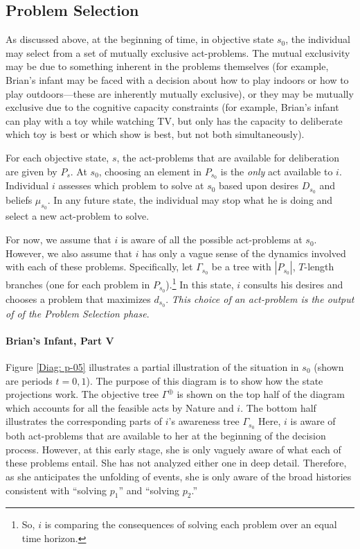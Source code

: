 \documentclass[
11pt,
titlepage,
reqno,
]{article}%
\theoremstyle{definition}
\begin{document}
\subsection{Problem Selection}

As discussed above, at the beginning of time, in objective state $s_0$, the individual may select from a set of mutually exclusive act-problems. 
The mutual exclusivity may be due to something inherent in the problems themselves (for example, Brian's infant may be faced with a decision about how to play indoors or how to play outdoors---these are inherently mutually exclusive), or they may be mutually exclusive due to the cognitive capacity constraints (for example, Brian's infant can play with a toy while watching TV, but only has the capacity to deliberate which toy is best or which show is best, but not both simultaneously).

For each objective state, $s$, the act-problems that are available for deliberation are given by $P_s$.
At $s_0$, choosing an element in $P_{s_0}$ is the \textit{only} act available to $i$.
Individual $i$ assesses which problem to solve at $s_0$ based upon desires $D_{s_0}$ and beliefs $\mu_{s_0}$.
In any future state, the individual may stop what he is doing and select a new act-problem to solve.

For now, we assume that $i$ is aware of all the possible act-problems at $s_0$.
However, we also assume that $i$ has only a vague sense of the dynamics involved with each of these problems.
Specifically, let $\Gamma_{s_0}$ be a tree with $|P_{s_0}|$, $T$-length branches (one for each problem in $P_{s_0}$).\footnote
{
	So, $i$ is comparing the consequences of solving each problem over an equal time horizon.
}
In this state, $i$ consults his desires and chooses a problem that maximizes $d_{s_0}$.
\textit{This choice of an act-problem is the output of of the Problem Selection phase}.

\paragraph{Brian's Infant, Part V}
Figure \ref{Diag: p-05} illustrates  a partial illustration of the situation in $s_0$ (shown are periods $t=0,1$).
The purpose of this diagram is to show how the state projections work.
The objective tree $\Gamma^\oplus$ is shown on the top half of the diagram which accounts for all the feasible acts by Nature and $i$.
The bottom half illustrates the corresponding parts of $i$'s awareness tree $\Gamma_{s_0}$
Here, $i$ is aware of both act-problems that are available to her at the beginning of the decision process.
However, at this early stage, she is only vaguely aware of what each of these problems entail.
She has not analyzed either one in deep detail.
Therefore, as she anticipates the unfolding of events, she is only aware of the broad histories consistent with ``solving $p_1$'' and ``solving $p_2$.''
\end{document}
